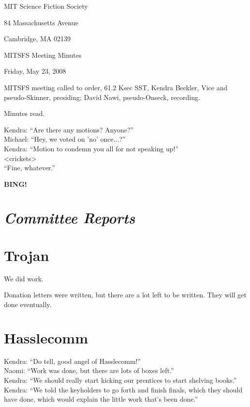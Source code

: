 \documentclass[10pt]{article}
\newcommand{\bing}{{\bf BING!} }
\newcommand{\goto}[1]{\bing \vskip 12pt \section*{{\em{#1}}}}
\begin{document}
\begin{center}

MIT Science Fiction Society

84 Massachusetts Avenue

Cambridge, MA 02139

\vspace{12pt}

MITSFS Meeting Minutes

Friday, May 23, 2008

\end{center}

\vspace{18pt}

\setlength{\parskip}{6pt}

\noindent
MITSFS meeting called to order, 61.2 Ksec SST,
Kendra Beckler, Vice and pseudo-Skinner, presiding; David Nawi, pseudo-Onseck, recording.

Minutes read.

Kendra: ``Are there any motions?  Anyone?''\\
Michael: ``Hey, we voted on 'no' once...?''\\
Kendra: ``Motion to condemn you all for not speaking up!''\\

<crickets>\\

``Fine, whatever.''

\BING

\goto{Committee Reports}

\section*{Trojan}

We did work.

Donation letters were written, but there are a lot left to be written.  They will get done eventually.

\section*{Hasslecomm}

Kendra: ``Do tell, good angel of Hasslecomm!''\\
Naomi: ``Work was done, but there are lots of boxes left.''\\
Kendra: ``We should really start kicking our prentices to start shelving books.''\\

Kendra: ``We told the keyholders to go forth and finish finals, which they should have done, which would explain the little work that's been done.''
\end{document}
